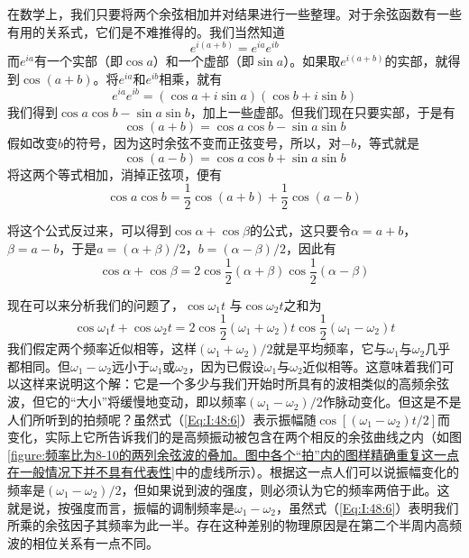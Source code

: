 在数学上，我们只要将两个余弦相加并对结果进行一些整理。对于余弦函数有一些有用的关系式，它们是不难推得的。我们当然知道
\begin{equation}
    \label{Eq:I:48:1}
    e^{i(a+b)} = e^{ia}e^{ib}
\end{equation}
而$e^{ia}$有一个实部（即$\cos a$）和一个虚部（即$\sin a$）。如果取$e^{i(a+b)}$的实部，就得到$\cos(a+b)$。将$e^{ia}$和$e^{ib}$相乘，就有
\begin{equation*}
    e^{ia}e^{ib} = (\cos a + i\sin a)(\cos b + i\sin b)
\end{equation*}
我们得到$\cos a \cos b -\sin a \sin b$，加上一些虚部。但我们现在只要实部，于是有
\begin{equation}
    \label{Eq:I:48:2}
    \cos(a+b) = \cos a \cos b - \sin a \sin b
\end{equation}
假如改变$b$的符号，因为这时余弦不变而正弦变号，所以，对$-b$，等式就是
\begin{equation}
    \label{Eq:I:48:3}
    \cos(a-b) = \cos a \cos b + \sin a \sin b
\end{equation}
将这两个等式相加，消掉正弦项，便有
\begin{equation}
    \label{Eq:I:48:4}
    \cos a \cos b = \frac{1}{2}\cos(a + b) + \frac{1}{2} \cos (a-b)
\end{equation}

将这个公式反过来，可以得到$\cos\alpha +\cos\beta$的公式，这只要令$\alpha =a +b$，$\beta=a-b$，于是$a =(\alpha+\beta)/2$，$b =(\alpha -\beta)/2$，因此有
\begin{equation}
    \label{Eq:I:48:5}
    \cos\alpha + \cos\beta = 2\cos\frac{1}{2}(\alpha + \beta)\cos\frac{1}{2}(\alpha - \beta)
\end{equation}

现在可以来分析我们的问题了，$\cos\omega_1 t$ 与$\cos\omega_2 t$之和为
\begin{equation}
    \label{Eq:I:48:6}
    \cos\omega_1t + \cos\omega_2t = 2\cos\frac{1}{2}(\omega_1 + \omega_2)t\cos\frac{1}{2}(\omega_1 - \omega_2)t
\end{equation}
我们假定两个频率近似相等，这样$(\omega_1 +\omega_2)/2$就是平均频率，它与$\omega_1$与$\omega_2$几乎都相同。但$\omega_1 -\omega_2$远小于$\omega_1$或$\omega_2$，因为已假设$\omega_1$与$\omega_2$近似相等。这意味着我们可以这样来说明这个解：它是一个多少与我们开始时所具有的波相类似的高频余弦波，但它的“大小”将缓慢地变动，即以频率$(\omega_1 -\omega_2)/2$作脉动变化。但这是不是人们所听到的拍频呢？虽然式（\ref{Eq:I:48:6}）表示振幅随$\cos[(\omega_1-\omega_2)t/2]$而变化，实际上它所告诉我们的是高频振动被包含在两个相反的余弦曲线之内（如图\ref{figure:频率比为8-10的两列余弦波的叠加。图中各个“拍”内的图样精确重复这一点在一般情况下并不具有代表性}中的虚线所示）。根据这一点人们可以说振幅变化的频率是$(\omega_1 -\omega_2)/2$，但如果说到波的强度，则必须认为它的频率两倍于此。这就是说，按强度而言，振幅的调制频率是$\omega_1 -\omega_2$，虽然式（\ref{Eq:I:48:6}）表明我们所乘的余弦因子其频率为此一半。存在这种差别的物理原因是在第二个半周内高频波的相位关系有一点不同。

